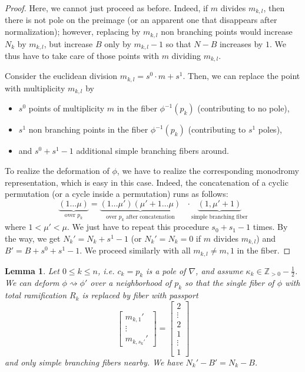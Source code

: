 \documentclass[12]{amsart}
\newtheorem{lem}[thm]{Lemma}
\begin{document}
\begin{proof}Here, we cannot just proceed as before. Indeed, if $m$ divides $m_{k,l}$, then there
is not pole on the preimage (or an apparent one that disappears after normalization); however, replacing 
by $m_{k,l}$ non branching points would increase $N_k$ by $m_{k,l}$, but increase $B$ only by $m_{k,l}-1$
so that $N-B$ increases by $1$. We thus have to take care of those points with $m$ dividing $m_{k,l}$.

Consider the euclidean division $m_{k,l}=s^0\cdot m+s^1$. Then, we can replace the point with 
multiplicity $m_{k,l}$ by 
\begin{itemize}
\item $s^0$ points of multiplicity $m$ in the fiber $\phi^{-1}(p_k)$ (contributing to no pole),
\item $s^1$ non branching points in the fiber $\phi^{-1}(p_k)$ (contributing to $s^1$ poles),
\item and $s^0+s^1-1$ additional simple branching fibers around.
\end{itemize}
To realize the deformation of $\phi$, we have to realize the corresponding monodromy representation,
which is easy in this case. Indeed, the concatenation of a cyclic permutation (or a cycle inside a permutation)
runs as follows:
$$\underbrace{(1\ldots \mu)}_{\text{over }p_k}=\underbrace{(1\ldots \mu')(\mu'+1\ldots\mu)}_{\text{over }p_k\text{ after concatenation}}\ \ \ \cdot \underbrace{(1,\mu'+1)}_{\text{simple branching fiber}}$$
where $1<\mu'<\mu$. We just have to repeat this procedure $s_0+s_1-1$ times.
By the way, we get $N_k'=N_k+s^1-1$ (or $N_k'=N_k=0$ if $m$ divides $m_{k,l}$)
 and $B'=B+s^0+s^1-1$. We proceed similarly with all $m_{k,l}\not=m,1$ in the fiber.
\end{proof}

\begin{lem}\label{lem:FibreIrregRam}
Let $0\le k\le n$, i.e. $c_k=p_k$ is a pole of $\nabla$, and assume $\kappa_k\in\mathbb Z_{>0}-\frac{1}{2}$.
We can deform $\phi\rightsquigarrow\phi'$ over a neighborhood of $p_k$ so that
the single fiber of $\phi$ with total ramification $R_k$ is replaced by fiber with passport
$$\left[\begin{matrix}m_{k,1}'\\  \vdots\\ m_{k,s_k'}'\end{matrix}\right]=\left[\begin{matrix}2\\ \vdots\\ 2\\ 1\\ \vdots\\ 1\end{matrix}\right]$$
and only simple branching fibers nearby.
We have  $N_k'-B'= N_k-B$.
\end{lem}
\end{document}

